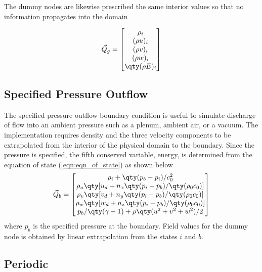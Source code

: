 The dummy nodes are likewise prescribed the same interior values so that no information propagates into the domain

\begin{equation}
\vec{Q}_g = \begin{bmatrix} \rho_i \\
  (\rho u)_i \\
  (\rho v)_i \\
  (\rho w)_i \\
  \qty(\rho E)_i \end{bmatrix}
\end{equation}

\subsection{Specified Pressure Outflow}

The specified pressure outflow boundary condition is useful to simulate discharge of flow into an ambient pressure such as a plenum, ambient air, or a vacuum. The implementation requires density and the three velocity components to be extrapolated from the interior of the physical domain to the boundary. Since the pressure is specified, the fifth conserved variable, energy, is determined from the equation of state (\cref{eqn:eqn_of_state}) as shown below%
%
\begin{equation}
\vec{Q}_b = \begin{bmatrix} \rho_i + \qty(p_b-p_i)/c_0^2 \\
  \rho_u \qty[u_d + n_x\qty(p_i-p_b)/\qty(\rho_0 c_0)] \\
  \rho_v \qty[v_d + n_y\qty(p_i-p_b)/\qty(\rho_0 c_0)] \\
  \rho_w \qty[w_d + n_z\qty(p_i-p_b)/\qty(\rho_0 c_0)] \\
  p_b/\qty(\gamma-1) + \rho\qty(u^2 + v^2 + w^2)/2 \end{bmatrix}
\end{equation}
%
where $p_b$ is the specified pressure at the boundary. Field values for the dummy node is obtained by linear extrapolation from the states $i$ and $b$.

\subsection{Periodic}

